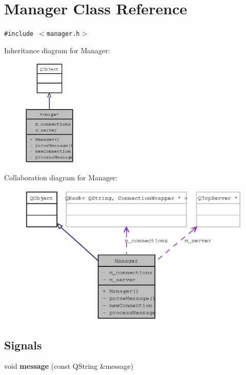\section{Manager Class Reference}
\label{classManager}
{\tt \#include $<$manager.h$>$}

Inheritance diagram for Manager:\nopagebreak
\begin{figure}[H]
\begin{center}
\leavevmode
\includegraphics[width=73pt]{classManager__inherit__graph}
\end{center}
\end{figure}
Collaboration diagram for Manager:\nopagebreak
\begin{figure}[H]
\begin{center}
\leavevmode
\includegraphics[width=400pt]{classManager__coll__graph}
\end{center}
\end{figure}
\subsection*{Signals}
\begin{CompactItemize}
\item 
void {\bf message} (const QString \&message)
\end{CompactItemize}

